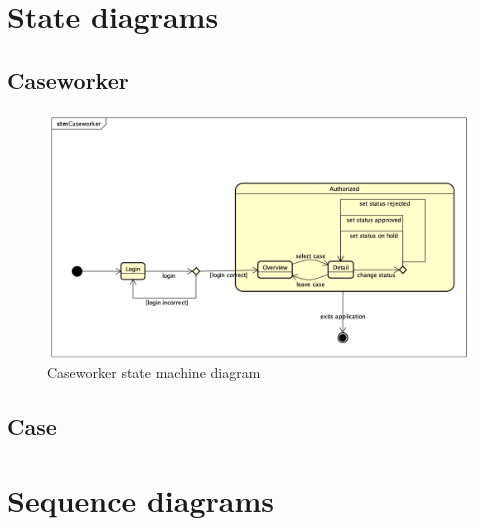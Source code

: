 \newpage
\section{State diagrams}
\subsection{Caseworker}
\begin{figure}[htb!]
    \centering
    \includegraphics[width=\textwidth]{img/stm-caseworker.png}
    \caption{Caseworker state machine diagram}
\end{figure}

\subsection{Case}

\newpage
\section{Sequence diagrams}
